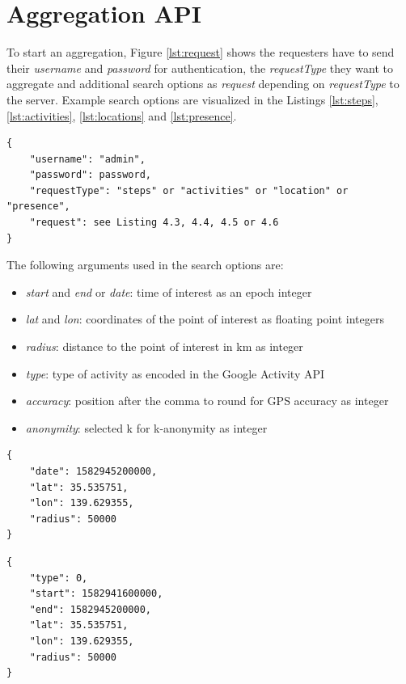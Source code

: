 \section{Aggregation API}

To start an aggregation, Figure \ref{lst:request} shows the requesters have to send their \textit{username} and \textit{password} for authentication, the \textit{requestType} they want to aggregate and additional search options as \textit{request} depending on \textit{requestType} to the server. Example search options are visualized in the Listings \ref{lst:steps}, \ref{lst:activities}, \ref{lst:locations} and \ref{lst:presence}.

\begin{lstlisting}[caption=Body of an HTTP request for initiating a new aggregation with the server., label={lst:request}]
{
    "username": "admin",
    "password": password,
    "requestType": "steps" or "activities" or "location" or "presence",
    "request": see Listing 4.3, 4.4, 4.5 or 4.6
}
\end{lstlisting}

The following arguments used in the search options are:
\begin{itemize}
    \item \textit{start} and \textit{end} or \textit{date}: time of interest as an epoch integer
    \item \textit{lat} and \textit{lon}: coordinates of the point of interest as floating point integers
    \item \textit{radius}: distance to the point of interest in km as integer
    \item \textit{type}: type of activity as encoded in the Google Activity API \cite{detectedactivity}
    \item \textit{accuracy}: position after the comma to round for GPS accuracy as integer
    \item \textit{anonymity}: selected k for k-anonymity as integer
\end{itemize}

\begin{lstlisting}[caption=Search options of an HTTP request for steps data., label={lst:steps}]
{
    "date": 1582945200000,
    "lat": 35.535751,
    "lon": 139.629355,
    "radius": 50000
}
\end{lstlisting}

\begin{lstlisting}[caption=Search options of an HTTP request for activities data, label={lst:activities}]
{
    "type": 0,
    "start": 1582941600000,
    "end": 1582945200000,
    "lat": 35.535751,
    "lon": 139.629355,
    "radius": 50000
}
\end{lstlisting}

